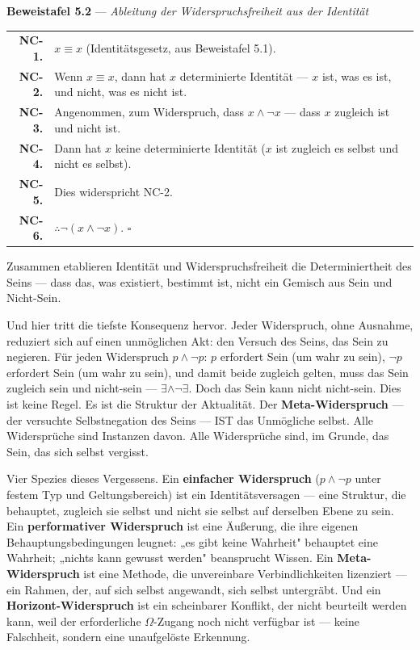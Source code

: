 \documentclass[10pt, openany, oneside]{book}
\renewcommand{\footnotesize}{\fontsize{8.5}{11}\selectfont}
\begin{document}
\vspace{0.5em}

\textbf{Beweistafel 5.2} --- \textit{Ableitung der Widerspruchsfreiheit aus der Identität}

\vspace{0.5em}

{\footnotesize
\noindent\begin{tabular}{r p{}}
\textbf{NC-1.} & $x \equiv x$ (Identitätsgesetz, aus Beweistafel 5.1). \\[0.3em]
\textbf{NC-2.} & Wenn $x \equiv x$, dann hat $x$ determinierte Identität --- $x$ ist, was es ist, und nicht, was es nicht ist. \\[0.3em]
\textbf{NC-3.} & Angenommen, zum Widerspruch, dass $x \wedge \neg x$ --- dass $x$ zugleich ist und nicht ist. \\[0.3em]
\textbf{NC-4.} & Dann hat $x$ keine determinierte Identität ($x$ ist zugleich es selbst und nicht es selbst). \\[0.3em]
\textbf{NC-5.} & Dies widerspricht NC-2. \\[0.3em]
\textbf{NC-6.} & $\therefore \neg(x \wedge \neg x)$. $\square$ \\[0.3em]
\end{tabular}
}

\vspace{0.8em}

\noindent Zusammen etablieren Identität und Widerspruchsfreiheit die Determiniertheit des Seins --- dass das, was existiert, bestimmt ist, nicht ein Gemisch aus Sein und Nicht-Sein.

Und hier tritt die tiefste Konsequenz hervor. Jeder Widerspruch, ohne Ausnahme, reduziert sich auf einen unmöglichen Akt: den Versuch des Seins, das Sein zu negieren. Für jeden Widerspruch $p \wedge \neg p$: $p$ erfordert Sein (um wahr zu sein), $\neg p$ erfordert Sein (um wahr zu sein), und damit beide zugleich gelten, muss das Sein zugleich sein und nicht-sein --- $\exists \wedge \neg\exists$. Doch das Sein kann nicht nicht-sein. Dies ist keine Regel. Es ist die Struktur der Aktualität. Der \textbf{Meta-Widerspruch} --- der versuchte Selbstnegation des Seins --- IST das Unmögliche selbst. Alle Widersprüche sind Instanzen davon. Alle Widersprüche sind, im Grunde, das Sein, das sich selbst vergisst.

Vier Spezies dieses Vergessens. Ein \textbf{einfacher Widerspruch} ($p \wedge \neg p$ unter festem Typ und Geltungsbereich) ist ein Identitätsversagen --- eine Struktur, die behauptet, zugleich sie selbst und nicht sie selbst auf derselben Ebene zu sein. Ein \textbf{performativer Widerspruch} ist eine Äußerung, die ihre eigenen Behauptungsbedingungen leugnet: „es gibt keine Wahrheit" behauptet eine Wahrheit; „nichts kann gewusst werden" beansprucht Wissen. Ein \textbf{Meta-Widerspruch} ist eine Methode, die unvereinbare Verbindlichkeiten lizenziert --- ein Rahmen, der, auf sich selbst angewandt, sich selbst untergräbt. Und ein \textbf{Horizont-Widerspruch} ist ein scheinbarer Konflikt, der nicht beurteilt werden kann, weil der erforderliche $\Omega$-Zugang noch nicht verfügbar ist --- keine Falschheit, sondern eine unaufgelöste Erkennung.
\end{document}
